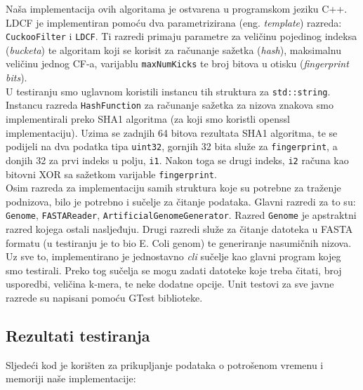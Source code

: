 \documentclass[seminarskirad]{fer}
\begin{document}
Naša implementacija ovih algoritama je ostvarena u programskom jeziku C++. LDCF je implementiran pomoću dva parametrizirana (eng. \textit{template}) razreda: \texttt{CuckooFilter} i \texttt{LDCF}. Ti razredi primaju parametre za veličinu pojedinog indeksa (\textit{bucketa}) te algoritam koji se korisit za računanje sažetka (\textit{hash}), maksimalnu veličinu jednog CF-a, varijablu \texttt{maxNumKicks} te broj bitova u otisku (\textit{fingerprint bits}).
\\
U testiranju smo uglavnom koristili instancu tih struktura za \texttt{std::string}. Instancu razreda \texttt{HashFunction} za računanje sažetka za nizova znakova smo implementirali preko SHA1 algoritma (za koji smo koristli openssl implementaciju). Uzima se zadnjih 64 bitova rezultata SHA1 algoritma, te se podijeli na dva podatka tipa \texttt{uint32}, gornjih 32 bita služe
za \texttt{fingerprint}, a donjih 32 za prvi indeks u polju, \texttt{i1}. Nakon toga se drugi indeks, \texttt{i2} računa kao bitovni XOR sa sažetkom varijable
\texttt{fingerprint}.
\\
Osim razreda za implementaciju samih struktura koje su potrebne za traženje podnizova, bilo je potrebno i sučelje za čitanje podataka. Glavni razredi za to su: \texttt{Genome}, \texttt{FASTAReader}, \texttt{ArtificialGenomeGenerator}. Razred \texttt{Genome} je apstraktni razred kojega ostali nasljeđuju. Drugi razredi služe za čitanje datoteka u FASTA formatu (u testiranju je to bio E. Coli genom) te generiranje nasumičnih nizova.
\\
Uz sve to, implementirano je jednostavno \textit{cli} sučelje kao glavni program kojeg smo testirali. Preko tog sučelja se mogu zadati datoteke koje treba čitati, broj usporedbi, veličina k-mera, te neke dodatne opcije.
Unit testovi za sve javne razrede su napisani pomoću GTest biblioteke.

\subsection{Rezultati testiranja}

Sljedeći kod je korišten za prikupljanje podataka o potrošenom vremenu i memoriji naše implementacije:
\end{document}
